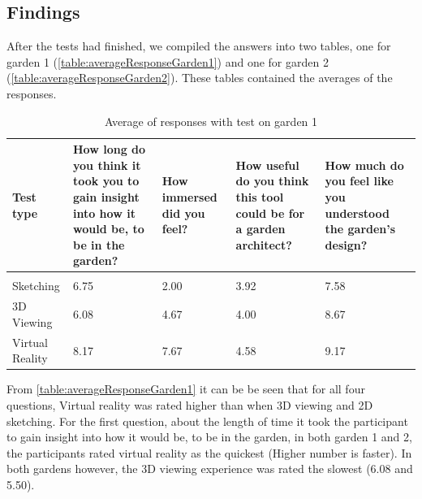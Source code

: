 \subsection{Findings}
After the tests had finished, we compiled the answers into two tables, one for garden 1 (\autoref{table:averageResponseGarden1}) and one for garden 2 (\autoref{table:averageResponseGarden2}). These tables contained the averages of the responses.
\begin{table}[H]
	\centering
	\caption{Average of responses with test on garden 1}
	\label{table:averageResponseGarden1}
	\begin{tabular}{p{3cm}|p{3cm}|p{2cm}|p{3cm}|p{3cm}}
		Test type       & How long do you think it took you to gain insight into how it would be, to be in the garden? & How immersed did you feel? & How useful do you think this tool could be for a garden architect? & How much do you feel like you understood the garden's design? \\ \hline
		&&&&\\
		Sketching       & 6.75    & 2.00    & 3.92      & 7.58            \\
		3D Viewing      & 6.08  & 4.67  & 4.00    & 8.67               \\
		Virtual Reality & 8.17     & 7.67     & 4.58      & 9.17    
	\end{tabular}
\end{table}
From \autoref{table:averageResponseGarden1} it can be be seen that for all four questions, Virtual reality was rated higher than when 3D viewing and 2D sketching. For the first question, about the length of time it took the participant to gain insight into how it would be, to be in the garden, in both garden 1 and 2, the participants rated virtual reality as the quickest (Higher number is faster). In both gardens however, the 3D viewing experience was rated the slowest (6.08 and 5.50).
